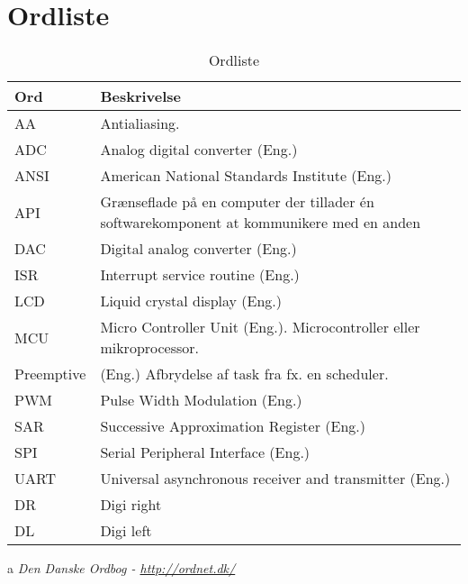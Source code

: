 \chapter{Ordliste} \label{bilag:ordliste}

\begin{table}[h!]
	\caption{Ordliste}
	\label{tab:ordliste}
	\begin{threeparttable}
		\begin{tabular}{l p{}}
			\toprule
			\textbf{Ord}      & \textbf{Beskrivelse}   \\ 
			\midrule
			AA			& Antialiasing.\\
			ADC			& Analog digital converter (Eng.)\\
			ANSI		& American National Standards Institute (Eng.)\\
			API			& Grænseflade på en computer der tillader én softwarekomponent at kommunikere med en anden\tnote{a}\\
			DAC			& Digital analog converter (Eng.)\\
			ISR			 & Interrupt service routine (Eng.) \\
			LCD			& Liquid crystal display (Eng.) \\
			MCU       	& Micro Controller Unit (Eng.). Microcontroller eller mikroprocessor. \\
			Preemptive	& (Eng.) Afbrydelse af task fra fx. en scheduler.\\
			PWM			& Pulse Width Modulation (Eng.) \\
			SAR			& Successive Approximation Register (Eng.)\\
			SPI			& Serial Peripheral Interface (Eng.)  \\
			UART		& Universal asynchronous receiver and transmitter (Eng.)\\
			DR & Digi right\\
			DL & Digi left\\
			\bottomrule
		\end{tabular}
	
		\begin{tablenotes}
			\item[a] \textit{Den Danske Ordbog - \url{http://ordnet.dk/}}
		\end{tablenotes}
	\end{threeparttable}
\end{table}
